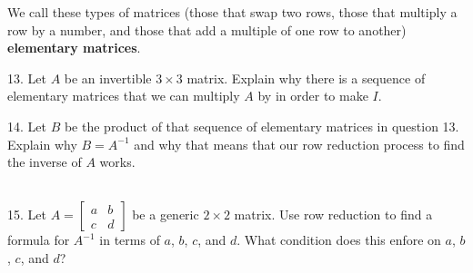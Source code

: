 \documentclass{article}
\begin{document}
We call these types of matrices (those that swap two rows, those that multiply a row by a number, and those that add a multiple of one row to another) \textbf{elementary matrices}.

13. Let $A$ be an invertible $3 \times 3$ matrix. Explain why there is a sequence of elementary matrices that we can multiply $A$ by in order to make $I$.

14. Let $B$ be the product of that sequence of elementary matrices in question 13. Explain why $B = A^{-1}$ and why that means that our row reduction process to find the inverse of $A$ works.

~\\

15. Let $\displaystyle A = \left[\begin{array}{cc}a& b \\ c& d\end{array}\right]$ be a generic $2 \times 2$ matrix. Use row reduction to find a formula for $A^{-1}$ in terms of $a$, $b$, $c$, and $d$. What condition does this enfore on $a$, $b$, $c$, and $d$?
\end{document}

